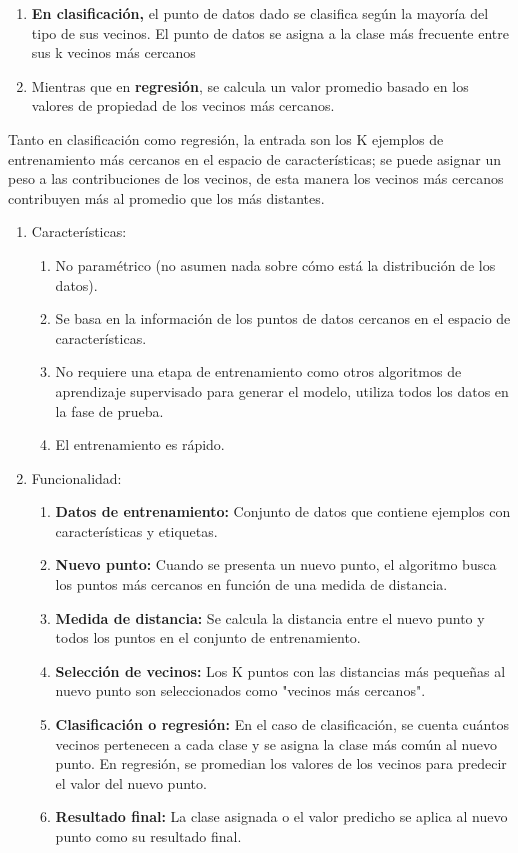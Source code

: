 \documentclass{article}
\begin{document}
\begin{sloppypar}
\begin{enumerate}
    \item \textbf{En clasificación,} el punto de datos dado se clasifica según la mayoría del tipo de sus vecinos. El punto de datos se asigna a la clase más frecuente entre sus k vecinos más cercanos     
    \item Mientras que en \textbf{regresión}, se calcula un valor promedio basado en los valores de propiedad de los vecinos más cercanos. 
\end{enumerate}

Tanto en clasificación como regresión, la entrada son los K ejemplos de entrenamiento más cercanos en el espacio de características; se puede asignar un peso a las contribuciones de los vecinos, de esta manera los vecinos más cercanos contribuyen más al promedio que los más distantes.

\begin{enumerate}
    \item Características:       
    \begin{enumerate}
       \item No paramétrico (no asumen nada sobre cómo está la distribución de los datos).     
       \item Se basa en la información de los puntos de datos cercanos en el espacio de características.
       \item No requiere una etapa de entrenamiento como otros algoritmos de aprendizaje supervisado para generar el modelo, utiliza todos los datos en la fase de prueba.
       \item El entrenamiento es rápido.
    \end{enumerate} 
    
    \item Funcionalidad:       
    \begin{enumerate}
       \item \textbf{Datos de entrenamiento:} Conjunto de datos que contiene ejemplos con características y etiquetas.
       \item \textbf{Nuevo punto:} Cuando se presenta un nuevo punto, el algoritmo busca los puntos más cercanos en función de una medida de distancia.
       \item \textbf{Medida de distancia:} Se calcula la distancia entre el nuevo punto y todos los puntos en el conjunto de entrenamiento.
       \item \textbf{Selección de vecinos: }Los K puntos con las distancias más pequeñas al nuevo punto son seleccionados como "vecinos más cercanos".
       \item \textbf{Clasificación o regresión:} En el caso de clasificación, se cuenta cuántos vecinos pertenecen a cada clase y se asigna la clase más común al nuevo punto. En regresión, se promedian los valores de los vecinos para predecir el valor del nuevo punto.
       \item \textbf{Resultado final: }La clase asignada o el valor predicho se aplica al nuevo punto como su resultado final.
    \end{enumerate} 
    

\end{enumerate}
\end{sloppypar}
\end{document}
